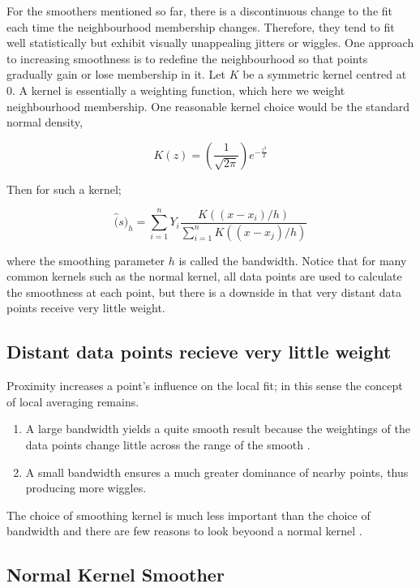 \documentclass[twoside]{article}
\theoremstyle{definition}
\theoremstyle{definition}
\begin{document}
For the smoothers mentioned so far, there is a discontinuous change to the fit each time the neighbourhood membership changes. Therefore, they tend to fit well statistically but exhibit visually unappealing jitters or wiggles.  One approach to increasing smoothness is to redefine the neighbourhood so that points gradually gain or lose membership in it. Let $K$ be a symmetric kernel centred at $0$. A kernel is essentially a weighting function, which here we weight neighbourhood membership. One reasonable kernel choice would be the standard normal density, 

\begin{equation}
	K(z) = \left( \frac{1}{\sqrt{2 \pi}} \right)e^{-\frac{z^2}{2}}
\end{equation}

Then for such a kernel;

\begin{equation}
	\hat(s)_h = \sum^n_{i=1} Y_i \frac{K\left( \left(  x-x_i\right) /h\right)}{\sum^n_{i=1}K\left( \left(  x-x_j\right) /h\right)}
\end{equation}

where the smoothing parameter $h$ is called the bandwidth. Notice that for many common kernels such as the normal kernel, all data points are used to calculate the smoothness at each point, but there is a downside in that very distant data points receive very little weight. 

\subsection{Distant data points recieve very little weight} 

Proximity increases a point's influence on the local fit; in this sense the concept of local averaging remains. 

\begin{enumerate}
	\item A large bandwidth yields a quite smooth result because the weightings of the data points change little across the range of the smooth .
	\item A small bandwidth ensures a much greater dominance of nearby points, thus producing more wiggles. 
\end{enumerate}

The choice of smoothing kernel is much less important than the choice of bandwidth and there are few reasons to look beyoond a normal kernel .

\subsection{Normal Kernel Smoother}
\end{document}
